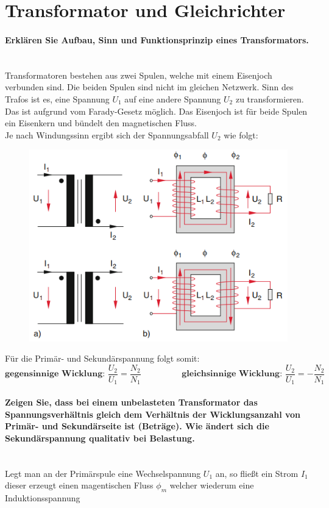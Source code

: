 \documentclass[a4paper, 11pt, parskip=half]{scrartcl}
\newcommand{\myparagraph}[1]{\paragraph{#1}\mbox{}\\}
\begin{document}
\newpage

\section{Transformator und Gleichrichter}

\myparagraph{Erklären Sie Aufbau, Sinn und Funktionsprinzip eines Transformators.}

Transformatoren bestehen aus zwei Spulen, welche mit einem Eisenjoch verbunden sind. Die beiden Spulen sind nicht im gleichen Netzwerk. 
Sinn des Trafos ist es, eine Spannung $U_1$ auf eine andere Spannung $U_2$ zu transformieren. Das ist aufgrund vom Farady-Gesetz möglich. Das Eisenjoch ist für beide Spulen 
ein Eisenkern und bündelt den magnetischen Fluss. \\
Je nach Windungssinn ergibt sich der Spannungsabfall $U_2$ wie folgt:
\begin{figure}[H]
    \centering
    \includegraphics[]{image/11_Trafo/Trafo_Aufbau.png}
\end{figure}
Für die Primär- und Sekundärspannung folgt somit:
\begin{equation}
    \textbf{gegensinnige Wicklung: } \frac{U_2}{U_1} = \frac{N_2}{N_1} \hspace{2cm} \textbf{gleichsinnige Wicklung: } \frac{U_2}{U_1} = - \frac{N_2}{N_1}
\end{equation}
\myparagraph{Zeigen Sie, dass bei einem unbelasteten Transformator das Spannungsverhältnis gleich dem
Verhältnis der Wicklungsanzahl von Primär- und Sekundärseite ist (Beträge). Wie ändert sich die
Sekundärspannung qualitativ bei Belastung.}
Legt man an der Primärspule eine Wechselspannung $U_1$ an, so fließt ein Strom $I_1$ dieser erzeugt einen magentischen Fluss $\phi_m$ welcher wiederum eine Induktionsspannung 
\end{document}
